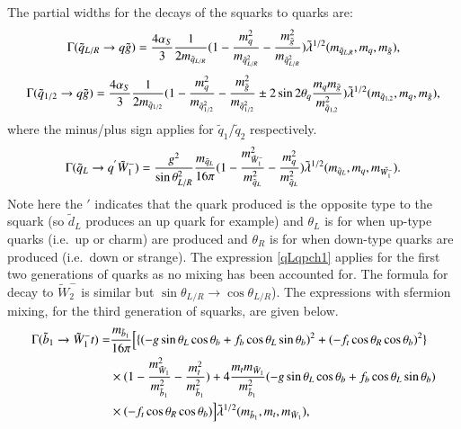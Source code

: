 \documentclass[final,3p,times]{elsarticle}
\begin{document}
The partial widths for the decays of the squarks to quarks are:
\begin{equation}\label{qLRqglu}
\Gamma(\tilde{q}_{L/R} \rightarrow q \tilde{g} ) = {4\alpha_{S} \over 3} {1 \over 2m_{\tilde{q}_{L/R}} } (1 - {m_{q}^2 \over m_{\tilde{q}_{L/R}^2}} - {m_{\tilde{g}}^2 \over m_{\tilde{q}_{L/R}^2}}) \tilde{\lambda}^{1/2} (m_{\tilde{q}_{L,R}}, m_q, m_{\tilde{g}}),
\end{equation} 
\begin{equation}\label{q12qglu}
\Gamma(\tilde{q}_{1/2} \rightarrow q \tilde{g} ) = {4\alpha_{S} \over 3} {1 \over 2m_{\tilde{q}_{1/2}} } (1 - {m_{q}^2 \over m_{\tilde{q}_{1/2}^2}} - {m_{\tilde{g}}^2 \over m_{\tilde{q}_{1/2}^2}} \pm 2\sin2\theta_q{m_qm_{\tilde{g}} \over m_{\tilde{q}_{1,2}}^2}) \tilde{\lambda}^{1/2} (m_{\tilde{q}_{1,2}}, m_q, m_{\tilde{g}}),
\end{equation} 
where the minus/plus sign applies for $\tilde{q}_1$/$\tilde{q}_2$ respectively.
\begin{equation}\label{qLqpch1}
\Gamma(\tilde{q}_{L} \rightarrow q^{'} \tilde{W}_{1}^- ) = {g^2 \over \sin\theta_{L/R}^2 } {m_{\tilde{q}_{L}} \over 16\pi} ( 1 - {m_{\tilde{W}_{1}^{-}}^2 \over m_{\tilde{q}_{L}}^2} - {m_{q}^2 \over m_{\tilde{q}_{L}}^2 }) \tilde{\lambda}^{1/2} (m_{\tilde{q}_{L}}, m_q, m_{\tilde{W_{1}^-}}).
\end{equation} 
Note here the $'$ indicates that the quark produced is the opposite type to the squark (so $\tilde{d}_L$
produces an up quark for example) and $\theta_L$ is for when up-type quarks (i.e.\ up or charm) are produced
and $\theta_R$ is for when down-type quarks are produced (i.e.\ down or strange). The expression \eqref{qLqpch1} applies for the first two generations of quarks as no mixing has been accounted for. The formula for decay to $\tilde{W}_{2}^{-}$ is similar but $\sin \theta_{L/R} \rightarrow \cos \theta_{L/R}$). The expressions with sfermion mixing, for the third generation of squarks, are given below.
\begin{equation}\label{b1tch1}
\begin{aligned}
\Gamma(\tilde{b}_{1} \rightarrow \tilde{W}_{1}^- t ) = & {m_{\tilde{b}_1} \over 16\pi} \Big[\{ ({-g\sin\theta_L\cos\theta_b + f_b\cos\theta_L\sin\theta_b})^2 + ({-f_t\cos\theta_R\cos\theta_b})^2 \} \\ & \times (1 - {m_{\tilde{W}_{1}}^2 \over m_{\tilde{b}_{1}}^2 } - {m_{t}^2 \over m_{\tilde{b}_{1}}^2 } ) + 4 {m_t m_{\tilde{W}_1} \over m_{\tilde{b}_1}^2 }({-g\sin\theta_L\cos\theta_b + f_b\cos\theta_L\sin\theta_b})\\ &  \times (-f_{t}\cos\theta_R\cos\theta_b)\Big]  \tilde{\lambda}^{1/2}(m_{\tilde{b}_1},m_t,m_{\tilde{W}_1}) ,
\end{aligned}
\end{equation} 
\end{document}
